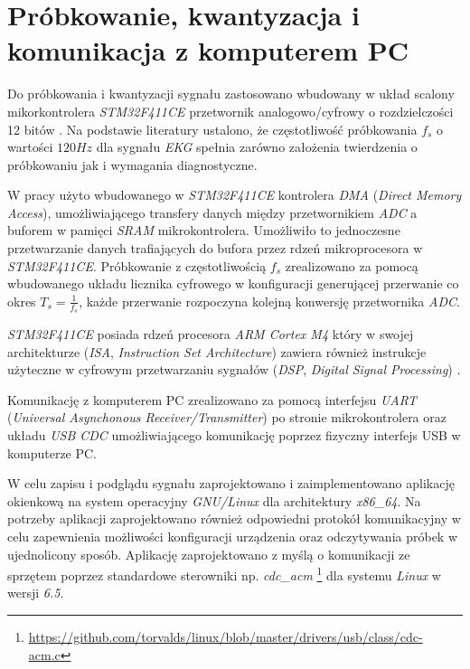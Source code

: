 \newpage

\section{Próbkowanie, kwantyzacja i komunikacja z komputerem PC}

Do próbkowania i kwantyzacji sygnału zastosowano wbudowany w układ scalony mikorkontrolera \textit{STM32F411CE} przetwornik analogowo/cyfrowy o rozdzielczości 12 bitów \cite{STM32F4DS}.
Na podstawie literatury \cite{Ajdaraga2018} ustalono, że częstotliwość próbkowania $f_{s}$ o wartości $120 Hz$ dla sygnału \textit{EKG} spełnia zarówno założenia twierdzenia o próbkowaniu
jak i wymagania diagnostyczne.


W pracy użyto wbudowanego w \textit{STM32F411CE} kontrolera \textit{DMA} (\textit{Direct Memory Access}), umożliwiającego
transfery danych między przetwornikiem \textit{ADC} a buforem w pamięci \textit{SRAM} mikrokontrolera. Umożliwiło to jednoczesne przetwarzanie danych
trafiających do bufora przez rdzeń mikroprocesora w \textit{STM32F411CE}. Próbkowanie z częstotliwością $f_{s}$ zrealizowano za pomocą wbudowanego
układu licznika cyfrowego w konfiguracji generującej przerwanie co okres $T_{s} = \frac{1}{f_s}$, każde przerwanie rozpoczyna kolejną konwersję przetwornika
\textit{ADC}.


\textit{STM32F411CE} posiada rdzeń procesora \textit{ARM Cortex M4} który w swojej architekturze (\textit{ISA}, \textit{Instruction Set Architecture}) zawiera również instrukcje
użyteczne w cyfrowym przetwarzaniu sygnałów (\textit{DSP}, \textit{Digital Signal Processing}) \cite{CM4DSP}.


Komunikację z komputerem PC zrealizowano za pomocą interfejsu \textit{UART} (\textit{Universal Asynchonous Receiver/Transmitter}) po stronie mikrokontrolera oraz układu \textit{USB CDC} 
umożliwiającego komunikację poprzez fizyczny interfejs USB w komputerze PC.


W celu zapisu i podglądu sygnału zaprojektowano i zaimplementowano aplikację okienkową na system operacyjny \textit{GNU/Linux} dla architektury \textit{x86\_64}.
Na potrzeby aplikacji zaprojektowano również odpowiedni protokół komunikacyjny w celu zapewnienia możliwości konfiguracji urządzenia oraz odczytywania
próbek w ujednolicony sposób. Aplikację zaprojektowano z myślą o komunikacji ze sprzętem poprzez standardowe sterowniki np. \textit{cdc\_acm} \footnote{\url{https://github.com/torvalds/linux/blob/master/drivers/usb/class/cdc-acm.c}}
dla systemu \textit{Linux} w wersji \textit{6.5}.

